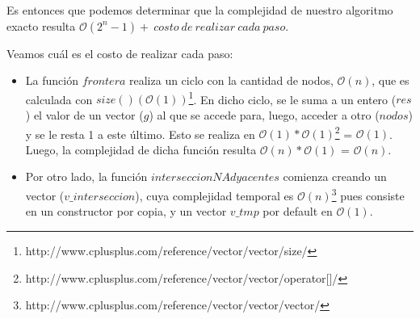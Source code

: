 Es entonces que podemos determinar que la complejidad de nuestro algoritmo exacto resulta $\mathcal{O}(2^n - 1) +\ costo\ de\ realizar\ cada\ paso$.

Veamos cuál es el costo de realizar cada paso:
\begin{itemize}
\item La función $frontera$ realiza un ciclo con la cantidad de nodos, $\mathcal{O}(n)$, que es calculada con $size()(\mathcal{O}(1))$\footnote{http://www.cplusplus.com/reference/vector/vector/size/}. En dicho ciclo, se le suma a un entero ($res$) el valor de un vector ($g$) al que se accede para, luego, acceder a otro ($nodos$) y se le resta 1 a este último. Esto se realiza en $\mathcal{O}(1)*\mathcal{O}(1)$\footnote{http://www.cplusplus.com/reference/vector/vector/operator[]/} = $\mathcal{O}(1)$. Luego, la complejidad de dicha función resulta $\mathcal{O}(n)*\mathcal{O}(1)$ = $\mathcal{O}(n)$.
\item Por otro lado, la función $interseccionNAdyacentes$ comienza creando un vector ($v\_interseccion$), cuya complejidad temporal es $\mathcal{O}(n)$\footnote{http://www.cplusplus.com/reference/vector/vector/vector/} pues consiste en un constructor por copia, y un vector $v\_tmp$ por default en $\mathcal{O}(1)$.
\end{itemize}
































